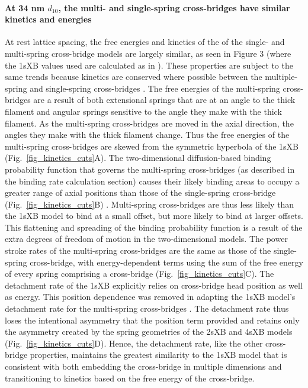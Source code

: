 \documentclass[11pt,titlepage]{article}
\begin{document}
\paragraph{At 34 nm $d_{10}$, the multi- and single-spring cross-bridges have similar kinetics and energies} %
At rest lattice spacing, the free energies and kinetics of the of the single- and multi-spring cross-bridge models are largely similar, as seen in Figure 3 (where the 1sXB values used are calculated as in \citet[Fig.~10]{Tanner2007}).  
These properties are subject to the same trends because kinetics are conserved where possible between the multiple-spring and single-spring cross-bridges \citep{Pate1989}.
The free energies of the multi-spring cross-bridges are a result of both extensional springs that are at an angle to the thick filament and angular springs sensitive to the angle they make with the thick filament. 
As the multi-spring cross-bridges are moved in the axial direction, the angles they make with the thick filament change. 
Thus the free energies of the multi-spring cross-bridges are skewed from the symmetric hyperbola of the 1sXB (Fig.~\ref{fig_kinetics_cuts}A).
The two-dimensional diffusion-based binding probability function that governs the multi-spring cross-bridges (as described in the binding rate calculation section) causes their likely binding areas to occupy a greater range of axial positions than those of the single-spring cross-bridge (Fig.~\ref{fig_kinetics_cuts}B) \citep{BergBook, DillBook}.
Multi-spring cross-bridges are thus less likely than the 1sXB model to bind at a small offset, but more likely to bind at larger offsets. 
This flattening and spreading of the binding probability function is a result of the extra degrees of freedom of motion in the two-dimensional models. 
The power stroke rates of the multi-spring cross-bridges are the same as those of the single-spring cross-bridge, with energy-dependent terms using the sum of the free energy of every spring comprising a cross-bridge (Fig.~\ref{fig_kinetics_cuts}C). 
The detachment rate of the 1sXB explicitly relies on cross-bridge head position as well as energy.
This position dependence was removed in adapting the 1sXB model's detachment rate for the multi-spring cross-bridges . 
The detachment rate thus loses the intentional asymmetry that the position term provided and retains only the asymmetry created by the spring geometries of the 2sXB and 4sXB models (Fig.~\ref{fig_kinetics_cuts}D). 
Hence, the detachment rate, like the other cross-bridge properties, maintains the greatest similarity to the 1sXB model that is consistent with both embedding the cross-bridge in multiple dimensions and transitioning to kinetics based on the free energy of the cross-bridge. 
\end{document}
